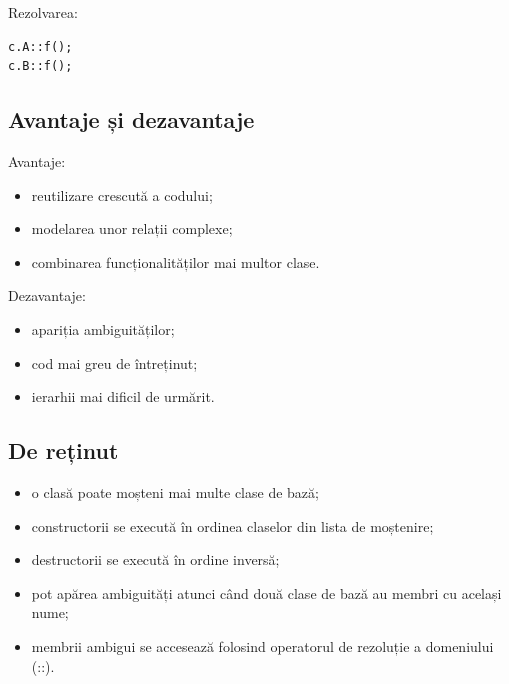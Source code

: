 \documentclass[12pt,a4paper]{article}
\begin{document}
Rezolvarea:

\begin{verbatim}
c.A::f();
c.B::f();
\end{verbatim}

\subsection{Avantaje și dezavantaje}

Avantaje:

\begin{itemize}
\item reutilizare crescută a codului;
\item modelarea unor relații complexe;
\item combinarea funcționalităților mai multor clase.
\end{itemize}

Dezavantaje:

\begin{itemize}
\item apariția ambiguităților;
\item cod mai greu de întreținut;
\item ierarhii mai dificil de urmărit.
\end{itemize}

\subsection{De reținut}

\begin{itemize}
\item o clasă poate moșteni mai multe clase de bază;
\item constructorii se execută în ordinea claselor din lista de moștenire;
\item destructorii se execută în ordine inversă;
\item pot apărea ambiguități atunci când două clase de bază au membri cu același nume;
\item membrii ambigui se accesează folosind operatorul de rezoluție a domeniului (::).
\end{itemize}
\end{document}
